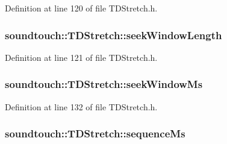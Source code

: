 Definition at line 120 of file T\+D\+Stretch.\+h.

\subsubsection[{\texorpdfstring{seek\+Window\+Length}{seekWindowLength}}]{ soundtouch\+::\+T\+D\+Stretch\+::seek\+Window\+Length\hspace{0.3cm}{\ttfamily [protected]}}\hypertarget{classsoundtouch_1_1_t_d_stretch_a760e50b9c59ab6ec44946bc186acf541}{}\label{classsoundtouch_1_1_t_d_stretch_a760e50b9c59ab6ec44946bc186acf541}


Definition at line 121 of file T\+D\+Stretch.\+h.

\subsubsection[{\texorpdfstring{seek\+Window\+Ms}{seekWindowMs}}]{ soundtouch\+::\+T\+D\+Stretch\+::seek\+Window\+Ms\hspace{0.3cm}{\ttfamily [protected]}}\hypertarget{classsoundtouch_1_1_t_d_stretch_aa1bd4510b56e3dcdcc68fd9cce930fec}{}\label{classsoundtouch_1_1_t_d_stretch_aa1bd4510b56e3dcdcc68fd9cce930fec}


Definition at line 132 of file T\+D\+Stretch.\+h.

\subsubsection[{\texorpdfstring{sequence\+Ms}{sequenceMs}}]{ soundtouch\+::\+T\+D\+Stretch\+::sequence\+Ms\hspace{0.3cm}{\ttfamily [protected]}}\hypertarget{classsoundtouch_1_1_t_d_stretch_ab6571642944948906bf5e2dd2b82a2a6}{}\label{classsoundtouch_1_1_t_d_stretch_ab6571642944948906bf5e2dd2b82a2a6}


